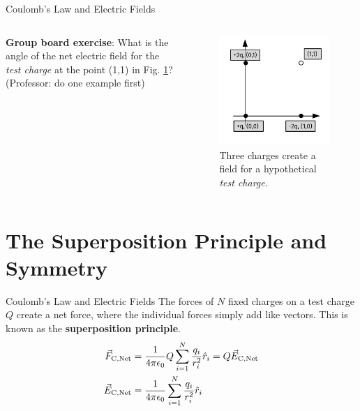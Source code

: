\documentclass{beamer}
\begin{document}
\begin{frame}{Coulomb’s Law and Electric Fields}
\small
\begin{columns}[T]
\begin{column}{0.5\textwidth}
\textbf{Group board exercise}: What is the angle of the net electric field for the \textit{test charge} at the point (1,1) in Fig. \ref{fig:netfield1}? \\ \vspace{0.5cm}
(Professor: do one example first)
\end{column}
\begin{column}{0.5\textwidth}
\begin{figure}
\includegraphics[width=\textwidth]{figures/NetField1.pdf}
\caption{\label{fig:netfield1} Three charges create a field for a hypothetical \textit{test charge}.}
\end{figure}
\end{column}
\end{columns}
\end{frame}

\section{The Superposition Principle and Symmetry}

\begin{frame}{Coulomb’s Law and Electric Fields}
The forces of $N$ fixed charges on a test charge $Q$ create a net force, where the individual forces simply add like vectors.  This is known as the \textbf{superposition principle}.
\begin{align}
\vec{F}_{\rm C,Net} &= \frac{1}{4\pi\epsilon_{\rm 0}} Q \sum_{i = 1}^N \frac{q_i}{r_i^2}\hat{r}_i = Q \vec{E}_{\rm C,Net} \\
\vec{E}_{\rm C,Net} &= \frac{1}{4\pi\epsilon_{\rm 0}} \sum_{i = 1}^N \frac{q_i}{r_i^2}\hat{r}_i
\end{align}
\end{frame}
\end{document}
